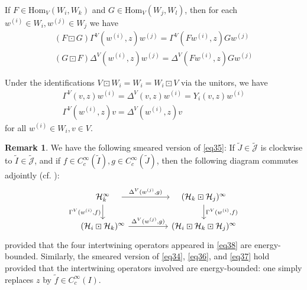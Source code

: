 \documentclass[11pt,b5paper,notitlepage]{article}
\theoremstyle{definition}
\newtheorem{rem}[df]{Remark}
\theoremstyle{plain}
\newcommand{\mc}{\mathcal}
\newcommand{\wtd}{\widetilde}
\newcommand{\Hom}{\mathrm{Hom}}
\newcommand{\Jtd}{\widetilde{\mathcal J}}
\numberwithin{equation}{section}
\begin{document}
If $F\in\Hom_V(W_i,W_k)$ and $G\in\Hom_V(W_j,W_l)$, then for each $w^{(i)}\in W_i,w^{(j)}\in W_j$ we have
\begin{subequations}\label{eq36}
\begin{gather}
(F\boxdot G)\Gamma^V(w^{(i)},z)w^{(j)}=\Gamma^V(Fw^{(i)},z)Gw^{(j)}\\
(G\boxdot F)\Delta^V(w^{(i)},z)w^{(j)}=\Delta^V(Fw^{(i)},z)Gw^{(j)}
\end{gather}
\end{subequations}

Under the identifications $V\boxdot W_i=W_i=W_i\boxdot V$ via the unitors, we have
\begin{subequations}\label{eq37}
\begin{gather}
\Gamma^V(v,z)w^{(i)}=\Delta^V(v,z)w^{(i)}=Y_i(v,z)w^{(i)}\label{eq37a}\\
\Gamma^V(w^{(i)},z)v=\Delta^V(w^{(i)},z)v
\end{gather}
\end{subequations}
for all $w^{(i)}\in W_i,v\in V$.


\begin{rem}\label{lb58}
We have the following smeared version of \eqref{eq35}: If $\wtd J\in\Jtd$ is clockwise to $\wtd I\in\Jtd$, and if $f\in C_c^\infty(\wtd I),g\in C_c^\infty(\wtd J)$, then the following diagram commutes adjointly (cf. \cite[Thm. 4.8]{Gui21a}):
\begin{equation}\label{eq38}
\begin{tikzcd}[column sep=huge]
\quad \mc H_k^\infty\quad \arrow[r,"{\Delta^V(w^{(j)},g)}"] \arrow[d, "{\Gamma^V(w^{(i)},f)}"'] &\quad (\mc H_k\boxdot\mc H_j)^\infty\quad \arrow[d, "{\Gamma^V(w^{(i)},f)}"]\\
(\mc H_i\boxdot\mc H_k)^\infty\arrow[r,"{\Delta^V(w^{(j)},g)}"] &(\mc H_i\boxdot\mc H_k\boxdot\mc H_j)^\infty
\end{tikzcd}
\end{equation}
provided that the four intertwining operators appeared in \eqref{eq38} are energy-bounded. Similarly, the smeared version of \eqref{eq34}, \eqref{eq36}, and \eqref{eq37} hold provided that the intertwining operators involved are energy-bounded: one simply replaces $z$ by $\wtd f\in C_c^\infty(I)$. 
\begin{comment}
In particular, by \eqref{eq38} and \eqref{eq37a}, we have for each homogeneous $w^{(i)}\in W^{(i)},v\in V$ and $f\in C_c^\infty(\wtd I),g\in C_c^\infty(J)$ the intertwining property
\begin{align}
Y_{i\boxdot j}(v,g)\Gamma^V(w^{(i)},f)|_{\mc H_j^\infty}=\Gamma^V(w^{(i)},f)Y_j(v,g)|_{\mc H_j^\infty}
\end{align}
\end{comment}
\end{rem}
\end{document}
